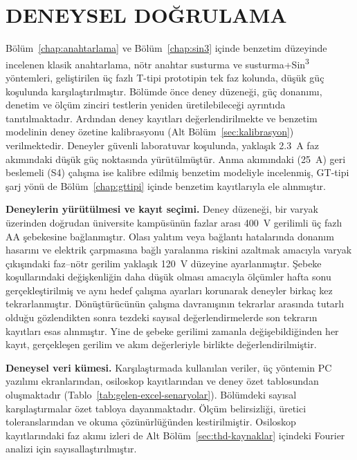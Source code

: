 \chapter{DENEYSEL DOĞRULAMA}
\label{chap:deney}

Bölüm~\ref{chap:anahtarlama} ve Bölüm~\ref{chap:sin3} içinde benzetim düzeyinde incelenen klasik anahtarlama, nötr anahtar susturma ve susturma+Sin\textsuperscript{3} yöntemleri, geliştirilen üç fazlı T-tipi prototipin tek faz kolunda, düşük güç koşulunda karşılaştırılmıştır. Bölümde önce deney düzeneği, güç donanımı, denetim ve ölçüm zinciri testlerin yeniden üretilebileceği ayrıntıda tanıtılmaktadır. Ardından deney kayıtları değerlendirilmekte ve benzetim modelinin deney özetine kalibrasyonu (Alt Bölüm~\ref{sec:kalibrasyon}) verilmektedir. Deneyler güvenli laboratuvar koşulunda, yaklaşık \SI{2.3}{\ampere} faz akımındaki düşük güç noktasında yürütülmüştür. Anma akımındaki (\SI{25}{\ampere}) geri beslemeli (S4) çalışma ise kalibre edilmiş benzetim modeliyle incelenmiş, GT-tipi şarj yönü de Bölüm~\ref{chap:gttipi} içinde benzetim kayıtlarıyla ele alınmıştır.

\textbf{Deneylerin yürütülmesi ve kayıt seçimi.} Deney düzeneği, bir varyak üzerinden doğrudan üniversite kampüsünün fazlar arası \SI{400}{\volt} gerilimli üç fazlı AA şebekesine bağlanmıştır. Olası yalıtım veya bağlantı hatalarında donanım hasarını ve elektrik çarpmasına bağlı yaralanma riskini azaltmak amacıyla varyak çıkışındaki faz--nötr gerilim yaklaşık \SI{120}{\volt} düzeyine ayarlanmıştır. Şebeke koşullarındaki değişkenliğin daha düşük olması amacıyla ölçümler hafta sonu gerçekleştirilmiş ve aynı hedef çalışma ayarları korunarak deneyler birkaç kez tekrarlanmıştır. Dönüştürücünün çalışma davranışının tekrarlar arasında tutarlı olduğu gözlendikten sonra tezdeki sayısal değerlendirmelerde son tekrarın kayıtları esas alınmıştır. Yine de şebeke gerilimi zamanla değişebildiğinden her kayıt, gerçekleşen gerilim ve akım değerleriyle birlikte değerlendirilmiştir.

\textbf{Deneysel veri kümesi.} Karşılaştırmada kullanılan veriler, üç yöntemin PC yazılımı ekranlarından, osiloskop kayıtlarından ve deney özet tablosundan oluşmaktadır (Tablo~\ref{tab:gelen-excel-senaryolar}). Bölümdeki sayısal karşılaştırmalar özet tabloya dayanmaktadır. Ölçüm belirsizliği, üretici toleranslarından ve okuma çözünürlüğünden kestirilmiştir. Osiloskop kayıtlarındaki faz akımı izleri de Alt Bölüm~\ref{sec:thd-kaynaklar} içindeki Fourier analizi için sayısallaştırılmıştır.

